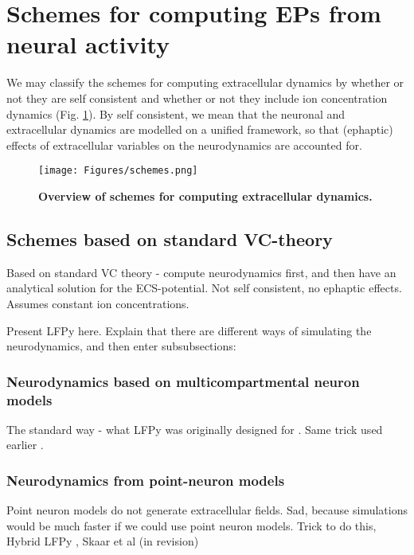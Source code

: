 \section{Schemes for computing EPs from neural activity}
\label{sec:schemes}

We may classify the schemes for computing extracellular dynamics by whether or not they are self consistent and whether or not they include ion concentration dynamics (Fig. \ref{fig:schemes}). By self consistent, we mean that the neuronal and extracellular dynamics are modelled on a unified framework, so that (ephaptic) effects of extracellular variables on the neurodynamics are accounted for. 


\begin{figure}[!ht]
\begin{center}
\texttt{[image: Figures/schemes.png]}
\end{center}
\caption{\textbf{Overview of schemes for computing extracellular dynamics.}}
\label{fig:schemes}
\end{figure}

\subsection{Schemes based on standard VC-theory}
Based on standard VC theory - compute neurodynamics first, and then have an analytical solution for the ECS-potential.
Not self consistent, no ephaptic effects. Assumes constant ion concentrations.

Present LFPy here. Explain that there are different ways of simulating the neurodynamics, and then enter subsubsections: 

\subsubsection{Neurodynamics based on multicompartmental neuron models}
The standard way - what LFPy was originally designed for \cite{Hagen2018}.
Same trick used earlier \citep{Holt1999}.

\subsubsection{Neurodynamics from point-neuron models}
Point neuron models do not generate extracellular fields. Sad, because simulations would be much faster if we could use point neuron models. Trick to do this, Hybrid LFPy \citep{Hagen2016}, Skaar et al (in revision)

